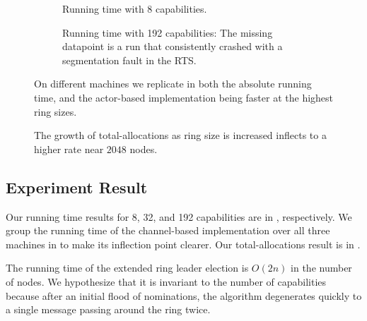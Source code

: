 \documentclass[sigplan,screen]{acmart}
\begin{document}
\begin{figure}
    \begin{subfigure}{\linewidth}
    {\small
        \def\svgwidth{\linewidth}
        
    }
    \caption{Running time with 8 capabilities.}
    \label{fig:perf-eval-time-n8}
    \end{subfigure}

    \begin{subfigure}{\linewidth}
    {\small
        \def\svgwidth{\linewidth}
        
    }
    \caption{
        Running time with 192 capabilities:
        The missing datapoint is a run that consistently crashed with a segmentation fault in the RTS.
    }
    \label{fig:perf-eval-time-n192}
    \end{subfigure}

\caption{
    On different machines we replicate
     in both the absolute running time, and
    the actor-based implementation being faster at the highest
    ring sizes.
}
\label{fig:perf-eval-time-rest}
\end{figure}

\begin{figure}
    {\small
        \def\svgwidth{\linewidth}
        
    }
    \caption{
        The growth of total-allocations as ring size is increased inflects to a
        higher rate near $2048$ nodes.
    }
    \label{fig:perf-group-chan}
\end{figure}

\subsection{Experiment Result}
\label{apx:exp-result}

Our running time results for 8, 32, and 192 capabilities are in
,
respectively.
%
We group the running time of the channel-based implementation over all three
machines in  to make its inflection point clearer.
%
Our total-allocations result is in .

The running time of the extended ring leader election is $O(2n)$ in the number
of nodes.
%
We hypothesize that it is invariant to the number of capabilities because after
an initial flood of nominations, the algorithm degenerates quickly to a single
message passing around the ring twice.
\end{document}
